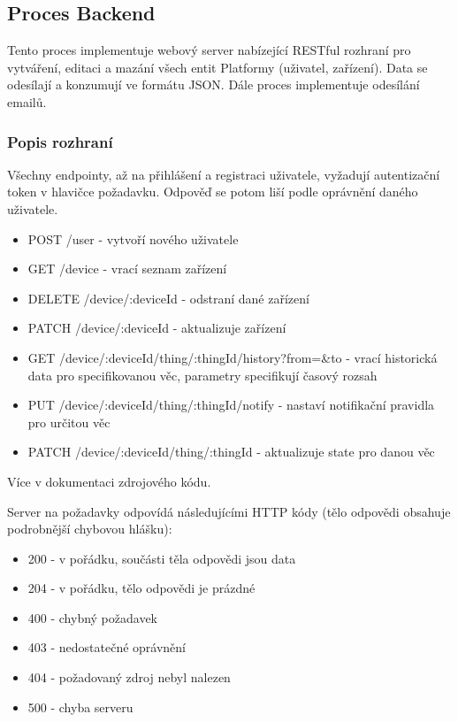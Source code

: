 \subsection{Proces Backend}
Tento proces implementuje webový server nabízející RESTful rozhraní pro vytváření, editaci a mazání všech entit Platformy (uživatel, zařízení). Data se odesílají a konzumují ve formátu JSON. Dále proces implementuje odesílání emailů.

\subsubsection{Popis rozhraní}
Všechny endpointy, až na přihlášení a registraci uživatele, vyžadují autentizační token v hlavičce požadavku. Odpověď se potom liší podle oprávnění daného uživatele.
\begin{itemize}
    \item POST /user - vytvoří nového uživatele
    \item GET /device - vrací seznam zařízení
    \item DELETE /device/:deviceId - odstraní dané zařízení
    \item PATCH /device/:deviceId - aktualizuje zařízení
    \item GET /device/:deviceId/thing/:thingId/history?from=\&to - vrací historická data pro specifikovanou věc, parametry specifikují časový rozsah
    \item PUT /device/:deviceId/thing/:thingId/notify - nastaví notifikační pravidla pro určitou věc
    \item PATCH /device/:deviceId/thing/:thingId - aktualizuje state pro danou věc
\end{itemize}
Více v dokumentaci zdrojového kódu.

Server na požadavky odpovídá následujícími HTTP kódy (tělo odpovědi obsahuje podrobnější chybovou hlášku):
\begin{itemize}
    \item 200 - v pořádku, součásti těla odpovědi jsou data
    \item 204 - v pořádku, tělo odpovědi je prázdné
    \item 400 - chybný požadavek
    \item 403 - nedostatečné oprávnění
    \item 404 - požadovaný zdroj nebyl nalezen
    \item 500 - chyba serveru
\end{itemize}


